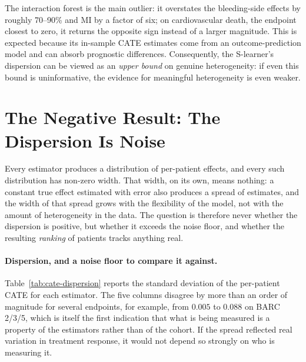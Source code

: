 The interaction forest is the main outlier: it overstates the bleeding-side
effects by roughly 70--90\% and MI by a factor of six; on cardiovascular
death, the endpoint closest to zero, it returns the opposite sign instead of
a larger magnitude. This is expected because its in-sample CATE estimates
come from an outcome-prediction model and can absorb prognostic differences.
Consequently, the S-learner's dispersion can be viewed as an \emph{upper
bound} on genuine heterogeneity: if even this bound is uninformative, the
evidence for meaningful heterogeneity is even weaker.

\section{The Negative Result: The Dispersion Is Noise}

Every estimator produces a distribution of per-patient effects, and every such
distribution has non-zero width. That width, on its own, means nothing: a
constant true effect estimated with error also produces a spread of estimates,
and the width of that spread grows with the flexibility of the model, not with
the amount of heterogeneity in the data. The question is therefore never
whether the dispersion is positive, but whether it exceeds the noise floor, and whether the resulting \emph{ranking} of patients tracks
anything real.

\paragraph{Dispersion, and a noise floor to compare it against.}
Table~\ref{tab:cate-dispersion} reports the standard deviation of the
per-patient CATE for each estimator. The five columns disagree by more than an
order of magnitude for several endpoints, for example, from $0.005$ to $0.088$
on BARC 2/3/5, which is itself the first indication that what is being measured is a
property of the estimators rather than of the cohort. If the spread reflected
real variation in treatment response, it would not depend so strongly on who
is measuring it.

